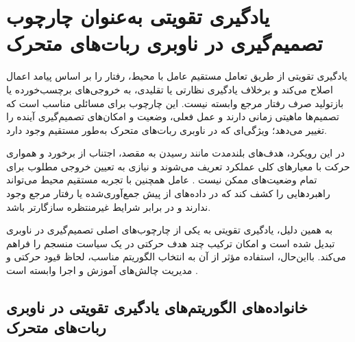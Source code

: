 \section{یادگیری تقویتی به‌عنوان چارچوب تصمیم‌گیری در ناوبری ربات‌های متحرک}

یادگیری تقویتی از طریق تعامل مستقیم عامل با محیط، رفتار را بر اساس پیامد اعمال اصلاح می‌کند و برخلاف یادگیری نظارتی یا تقلیدی، به خروجی‌های برچسب‌خورده یا بازتولید صرف رفتار مرجع وابسته نیست. این چارچوب برای مسائلی مناسب است که تصمیم‌ها ماهیتی زمانی دارند و عمل فعلی، وضعیت و امکان‌های تصمیم‌گیری آینده را تغییر می‌دهد؛ ویژگی‌ای که در ناوبری ربات‌های متحرک به‌طور مستقیم وجود دارد.

در این رویکرد، هدف‌های بلندمدت مانند رسیدن به مقصد، اجتناب از برخورد و همواری حرکت با معیارهای کلی عملکرد تعریف می‌شوند و نیازی به تعیین خروجی مطلوب برای تمام وضعیت‌های ممکن نیست %
\cite{Zhu2021}.
عامل همچنین با تجربه مستقیم محیط می‌تواند راهبردهایی را کشف کند که در داده‌های از پیش جمع‌آوری‌شده یا رفتار مرجع وجود ندارند و در برابر شرایط غیرمنتظره سازگارتر باشد.

به همین دلیل، یادگیری تقویتی به یکی از چارچوب‌های اصلی تصمیم‌گیری در ناوبری تبدیل شده است و امکان ترکیب چند هدف حرکتی در یک سیاست منسجم را فراهم می‌کند. بااین‌حال، استفاده مؤثر از آن به انتخاب الگوریتم مناسب، لحاظ قیود حرکتی و مدیریت چالش‌های آموزش و اجرا وابسته است %
\cite{s25113394}.
\subsection{خانواده‌های الگوریتم‌های یادگیری تقویتی در ناوبری ربات‌های متحرک}

